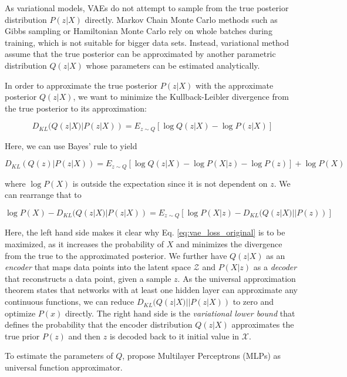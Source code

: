 \documentclass[8pt]{article}
\begin{document}
{As variational models, VAEs do not attempt to sample from the true posterior distribution $P(z|X)$ directly. Markov Chain Monte Carlo methods such as Gibbs sampling or Hamiltonian Monte Carlo rely on whole batches during training, which is not suitable for bigger data sets. Instead, variational method assume that the true posterior can be approximated by another parametric distribution $Q(z|X)$ whose parameters can be estimated analytically. 

In order to approximate the true posterior  $P(z|X)$ with the approximate posterior $Q(z|X)$, we want to minimize the Kullback-Leibler divergence from the true posterior to its approximation: 

\begin{equation}
D_{KL}(Q(z|X)|P(z|X)) = E_{z\sim Q}[\log Q(z|X) - \log P(z|X)]
\end{equation}

Here, we can use Bayes' rule to yield 

\begin{equation}
D_{KL}(Q(z)|P(z|X)) = E_{z\sim Q}[\log Q(z|X) - \log P(X|z)-\log P(z)] + \log P(X)
\end{equation}

where $\log P(X)$ is outside the expectation since it is not dependent on $z$. We can rearrange that to 

\begin{equation}
\label{eq:vae_loss_original}
\log P(X) - D_{KL}(Q(z|X)|P(z|X)) = E_{z\sim Q}[\log P(X|z) - D_{KL}(Q(z|X)||P(z))] 
\end{equation}

Here, the left hand side makes it clear why Eq. \ref{eq:vae_loss_original} is to be maximized, as it increases the probability of $X$ and minimizes the divergence from the true to the approximated posterior. We further have $Q(z|X)$ as an \textit{encoder} that maps data points into the latent space $\mathcal{Z}$ and $P(X|z)$ as a \textit{decoder} that reconstructs a data point, given a sample $z$. As the universal approximation theorem states that networks with at least one hidden layer can approximate any continuous functions, we can reduce $D_{KL}(Q(z|X)||P(z|X))$ to zero and optimize $P(x)$ directly. The right hand side is the \textit{variational lower bound} that defines the probability that the encoder distribution $Q(z|X)$ approximates the true prior $P(z)$ and then $z$ is decoded back to it initial value in $\mathcal{X}$.

To estimate the parameters of $Q$,  \cite{kingma2013auto} propose Multilayer Perceptrons (MLPs) as universal function approximator.

}
\end{document}
